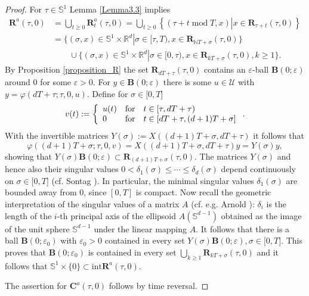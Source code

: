 \documentclass{siamltex}%
\begin{document}
\begin{proof}
For $\tau\in\mathbb{S}^{1}$ Lemma \ref{Lemma3.3} implies%
\begin{align*}
\mathbf{R}^{a}(\tau,0)  &  =\bigcup_{t\geq0}\mathbf{R}_{t}^{a}(\tau
,0)=\bigcup_{t\geq0}\left\{  (\tau+t\operatorname{mod}T,x)\left\vert
x\in\mathbf{R}_{\tau+t}(\tau,0)\right.  \right\} \\
&  =\{(\sigma,x)\in\mathbb{S}^{1}\times\mathbb{R}^{d}\left\vert \sigma
\in\lbrack\tau,T),x\in\mathbf{R}_{\mathbb{N}T+\sigma}(\tau,0)\right.  \}\\
&  \qquad\cup\{(\sigma,x)\in\mathbb{S}^{1}\times\mathbb{R}^{d}\left\vert
\sigma\in\lbrack0,\tau),x\in\mathbf{R}_{kT+\sigma}(\tau,0),k\geq1\right.
\}\text{.}%
\end{align*}
By Proposition \ref{proposition_R} the set $\mathbf{R}_{dT+\tau}(\tau,0)$
contains an $\varepsilon$-ball $\mathbf{B}(0;\varepsilon)$ around $0$ for some
$\varepsilon>0$. For $y\in\mathbf{B}(0;\varepsilon)$ there is some
$u\in\mathcal{U}$ with $y=\varphi(dT+\tau;\tau,0,u)$. Define for $\sigma
\in\lbrack0,T]$%
\[
v(t):=\left\{
\begin{array}
[c]{lll}%
u(t) & \text{for} & t\in\lbrack\tau,dT+\tau)\\
0 & \text{for} & t\in\lbrack dT+\tau,(d+1)T+\sigma]
\end{array}
\right.  .
\]
With the invertible matrices $Y(\sigma):=X((d+1)T+\sigma,dT+\tau)$ it follows
that%
\[
\varphi((d+1)T+\sigma;\tau,0,v)=X((d+1)T+\sigma,dT+\tau)y=Y(\sigma)y,
\]
showing that $Y(\sigma)\mathbf{B}(0;\varepsilon)\subset\mathbf{R}%
_{(d+1)T+\sigma}(\tau,0)$. The matrices $Y(\sigma)$ and hence also their
singular values $0<\delta_{1}(\sigma)\leq\cdots\leq\delta_{d}(\sigma)$ depend
continuously on $\sigma\in\lbrack0,T]$ (cf. Sontag \cite[Corollary
A.4.4]{Son98}). In particular, the minimal singular values $\delta_{1}%
(\sigma)$ are bounded away from $0$, since $[0,T]$ is compact. Now recall the
geometric interpretation of the singular values of a matrix $A$ (cf. e.g.
Arnold \cite[p. 118]{Arno98}): $\delta_{i}$ is the length of the $i$-th
principal axis of the ellipsoid $A(\mathbb{S}^{d-1})$ obtained as the image of
the unit sphere $\mathbb{S}^{d-1}$ under the linear mapping $A$. It follows
that there is a ball $\mathbf{B}(0;\varepsilon_{0})$ with $\varepsilon_{0}>0$
contained in every set $Y(\sigma)\mathbf{B}(0;\varepsilon),\sigma\in
\lbrack0,T]$. This proves that $\mathbf{B}(0;\varepsilon_{0})$ is contained in
every set $\bigcup\nolimits_{k\geq1}\mathbf{R}_{kT+\sigma}(\tau,0)$ and it
follows that $\mathbb{S}^{1}\times\{0\}\subset\mathrm{int}\mathbf{R}^{a}%
(\tau,0)$.

The assertion for $\mathbf{C}^{a}(\tau,0)$ follows by time reversal.
\end{proof}
\end{document}
